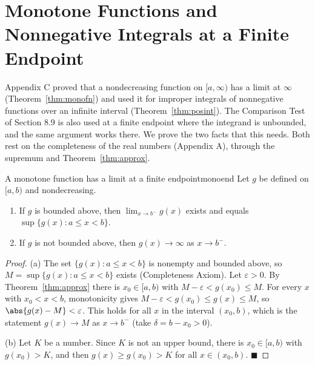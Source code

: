 \documentclass[11pt]{article}
\begin{document}
\section{Monotone Functions and Nonnegative Integrals at a Finite Endpoint}

Appendix C proved that a nondecreasing function on $[a,\infty)$ has a limit at $\infty$ (Theorem~\ref{thm:monofn}) and used it for improper integrals of nonnegative functions over an infinite interval (Theorem~\ref{thm:posint}). The Comparison Test of Section 8.9 is also used at a finite endpoint where the integrand is unbounded, and the same argument works there. We prove the two facts that this needs. Both rest on the completeness of the real numbers (Appendix A), through the supremum and Theorem~\ref{thm:approx}.

\begin{thm}{A monotone function has a limit at a finite endpoint}{monoend}
Let $g$ be defined on $[a,b)$ and nondecreasing. 
\begin{enumerate}[label=(\alph*)]
  \item If $g$ is bounded above, then $\lim_{x\to b^-}g(x)$ exists and equals $\sup\{g(x):a\le x<b\}$.
  \item If $g$ is not bounded above, then $g(x)\to\infty$ as $x\to b^-$.
\end{enumerate}
\end{thm}
\begin{proof}
(a) The set $\{g(x):a\le x<b\}$ is nonempty and bounded above, so $M=\sup\{g(x):a\le x<b\}$ exists (Completeness Axiom). Let $\varepsilon>0$. By Theorem~\ref{thm:approx} there is $x_0\in[a,b)$ with $M-\varepsilon<g(x_0)\le M$. For every $x$ with $x_0<x<b$, monotonicity gives $M-\varepsilon<g(x_0)\le g(x)\le M$, so $\abs{g(x)-M}<\varepsilon$. This holds for all $x$ in the interval $(x_0,b)$, which is the statement $g(x)\to M$ as $x\to b^-$ (take $\delta=b-x_0>0$).

(b) Let $K$ be a number. Since $K$ is not an upper bound, there is $x_0\in[a,b)$ with $g(x_0)>K$, and then $g(x)\ge g(x_0)>K$ for all $x\in(x_0,b)$. $\blacksquare$
\end{proof}
\end{document}
